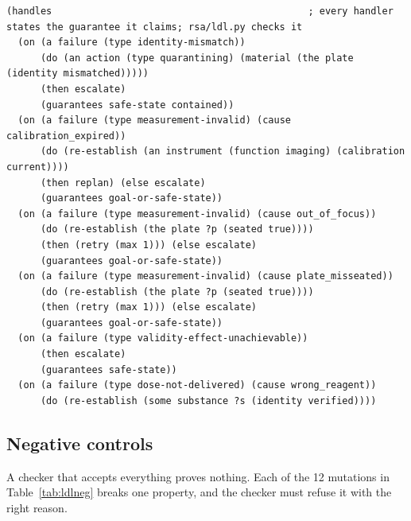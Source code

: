 \documentclass[10pt,a4paper]{article}
\begin{document}
\begin{listing}[tbp]
\begin{Verbatim}[fontsize=\footnotesize,breaklines,frame=lines,framesep=2mm]
(handles                                             ; every handler states the guarantee it claims; rsa/ldl.py checks it
  (on (a failure (type identity-mismatch))
      (do (an action (type quarantining) (material (the plate (identity mismatched)))))
      (then escalate)
      (guarantees safe-state contained))
  (on (a failure (type measurement-invalid) (cause calibration_expired))
      (do (re-establish (an instrument (function imaging) (calibration current))))
      (then replan) (else escalate)
      (guarantees goal-or-safe-state))
  (on (a failure (type measurement-invalid) (cause out_of_focus))
      (do (re-establish (the plate ?p (seated true))))
      (then (retry (max 1))) (else escalate)
      (guarantees goal-or-safe-state))
  (on (a failure (type measurement-invalid) (cause plate_misseated))
      (do (re-establish (the plate ?p (seated true))))
      (then (retry (max 1))) (else escalate)
      (guarantees goal-or-safe-state))
  (on (a failure (type validity-effect-unachievable))
      (then escalate)
      (guarantees safe-state))
  (on (a failure (type dose-not-delivered) (cause wrong_reagent))
      (do (re-establish (some substance ?s (identity verified))))
\end{Verbatim}
\caption{Handlers of the experiment's control program (excerpt of \texttt{challenge\_\allowbreak{}rescue.ldl}).}\label{lst:handlers}
\end{listing}

\subsection{Negative controls}\label{sec:ldlneg}

A checker that accepts everything proves nothing. Each of the 12 mutations in Table~\ref{tab:ldlneg} breaks one property, and the checker must refuse it with the right reason.
\end{document}
